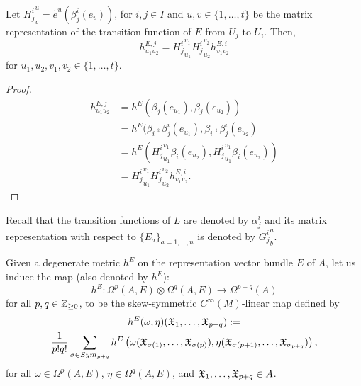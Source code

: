 \begin{proposition}\label{propositionTransformationLawMetricHGeneralBUndleRepresentation}
Let ${H^i_j}^u_v = \tilde e^u(\beta^i_j(e_v))$, for $i, j \in I$ and $u, v \in \{1, \dots, t\}$ be the matrix representation of the transition function of $E$ from $U_j$ to $U_i$. Then,
\begin{equation}
    h^{E, j}_{u_1 u_2} = {H^i_j}^{v_1}_{u_1}{H^i_j}^{v_2}_{u_2} h^{E, i}_{v_1 v_2}
\end{equation}
for $u_1, u_2, v_1, v_2 \in \{1, \dots, t\}$.
\end{proposition}
\begin{proof}
\begin{align*}
    h^{E, j}_{u_1 u_2} 
        &= h^E(\beta_j(e_{u_1}),\beta_j(e_{u_2})) \\
        &= h^E(\beta_i \comp \beta^i_j(e_{u_1}), \beta_i \comp \beta^i_j(e_{u_2})\\
        &= h^E({H^i_j}^{v_1}_{u_1} \beta_i(e_{u_2}), {H^i_j}^{v_1}_{u_1} \beta_i(e_{u_2}))\\
        &= {H^i_j}^{v_1}_{u_1}{H^i_j}^{v_2}_{u_2} h^{E, i}_{v_1 v_2}.
\end{align*}
\end{proof}
Recall that the transition functions of $L$ are denoted by $\alpha^i_j$ and its matrix representation with respect to $\{E_a\}_{a = 1, \dots, n}$ is denoted by ${G^i_j}^a_b$.

\begin{definition}\label{definitionMetricINducedProductOfEValuedForms}
    Given a degenerate metric $h^E$ on the representation vector bundle $E$ of $A$, let us induce the map (also denoted by $h^E$):
    \begin{equation}
        h^E: \Omega^p(A, E) \otimes \Omega^q(A, E) \to \Omega^{p+q}(A)
    \end{equation}
    for all $p, q \in \mathbb{Z}_{\geq 0}$, to be the skew-symmetric $C^\infty(M)$-linear map defined by
    \begin{multline}
        h^E(\omega, \eta)(\mathfrak{X}_1, \dots, \mathfrak{X}_{p+q}) :=\\ \frac{1}{p!q!} \sum_{\sigma \in Sym_{p+q}} 
        h^E\left( \omega(\mathfrak{X}_{\sigma(1)}, \dots, \mathfrak{X}_{\sigma(p)}),  \eta(\mathfrak{X}_{\sigma(p+1)}, \dots, \mathfrak{X}_{\sigma_{p+q}}) \right),
    \end{multline}
    for all $\omega \in \Omega^p(A, E)$, $\eta \in \Omega^q(A, E)$, and $\mathfrak{X}_1, \dots, \mathfrak{X}_{p+q} \in A$.
\end{definition}


